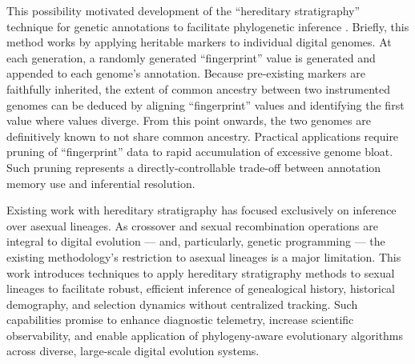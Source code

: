 This possibility motivated development of the ``hereditary stratigraphy'' technique for genetic annotations to facilitate phylogenetic inference \citep{moreno2022hereditary}.
Briefly, this method works by applying heritable markers to individual digital genomes.
At each generation, a randomly generated ``fingerprint'' value is generated and appended to each genome's annotation.
Because pre-existing markers are faithfully inherited, the extent of common ancestry between two instrumented genomes can be deduced by aligning ``fingerprint'' values and identifying the first value where values diverge.
From this point onwards, the two genomes are definitively known to not share common ancestry.
Practical applications require pruning of ``fingerprint'' data to rapid accumulation of excessive genome bloat.
Such pruning represents a directly-controllable trade-off between annotation memory use and inferential resolution.

Existing work with hereditary stratigraphy has focused exclusively on inference over asexual lineages.
As crossover and sexual recombination operations are integral to digital evolution --- and, particularly, genetic programming --- the existing methodology's restriction to asexual lineages is a major limitation.
This work introduces techniques to apply hereditary stratigraphy methods to sexual lineages to facilitate robust, efficient inference of genealogical history, historical demography, and selection dynamics without centralized tracking.
Such capabilities promise to enhance diagnostic telemetry, increase scientific observability, and enable application of phylogeny-aware evolutionary algorithms across diverse, large-scale digital evolution systems.





